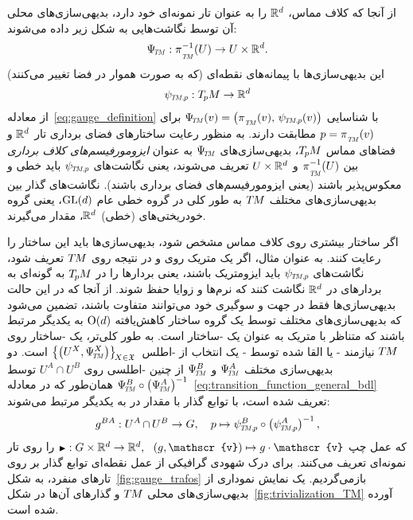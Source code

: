 از آنجا که کلاف مماس، $\mathbb{R}^d$ را به عنوان تار نمونه‌ای خود دارد، بدیهی‌سازی‌های محلی آن توسط نگاشت‌هایی به شکل زیر داده می‌شوند:
\begin{align}\label{eq:trivialization_TM}
	{\PsiTM: \piTM^{-1}\!\left(U\right) \to U\times\R^d} .
\end{align}
این بدیهی‌سازی‌ها با پیمانه‌های نقطه‌ای (که به صورت هموار در فضا تغییر می‌کنند)
\begin{align}\label{eq:def_psiTMp}
	\psiTMp: \TpM \to \R^d
\end{align}
از معادله~\eqref{eq:gauge_definition} با شناسایی $\PsiTM(v) = \left(\piTM(v),\, \psiTMp(v) \right)$ برای $p=\piTM(v)$ مطابقت دارند.
به منظور رعایت ساختارهای فضای برداری تار $\mathbb{R}^d$ و فضاهای مماس $T_{\mkern-1.5mu p}\mkern-.5muM$، بدیهی‌سازی‌های $\PsiTM$ به عنوان \emph{ایزومورفیسم‌های کلاف برداری} بین $\piTM^{-1}(U)$ و $U\times\mathbb{R}^d$ تعریف می‌شوند، یعنی نگاشت‌های $\psiTMp$ باید خطی و معکوس‌پذیر باشند (یعنی ایزومورفیسم‌های فضای برداری باشند).
نگاشت‌های گذار بین بدیهی‌سازی‌های مختلف $T\mkern-1.5muM$ به طور کلی در گروه خطی عام $\operatorname{GL}(d)$، یعنی گروه خودریختی‌های (خطی) $\mathbb{R}^d$، مقدار می‌گیرند.


اگر ساختار بیشتری روی کلاف مماس مشخص شود، بدیهی‌سازی‌ها باید این ساختار را رعایت کنند.
به عنوان مثال، اگر یک متریک روی  و در نتیجه روی $T\mkern-1.5muM$ تعریف شود، نگاشت‌های $\psiTMp$ باید ایزومتریک باشند، یعنی بردارها را در $T_{\mkern-1.5mu p}\mkern-.5muM$ به گونه‌ای به بردارهای در $\mathbb{R}^d$ نگاشت کنند که نرم‌ها و زوایا حفظ شوند.
از آنجا که در این حالت بدیهی‌سازی‌ها فقط در جهت و سوگیری خود می‌توانند متفاوت باشند، تضمین می‌شود که بدیهی‌سازی‌های مختلف توسط یک گروه ساختار کاهش‌یافته $\operatorname{O}(d)$ به یکدیگر مرتبط باشند که متناظر با متریک به عنوان یک -ساختار است.
به طور کلی‌تر، یک -ساختار روی $T\mkern-1.5muM$ نیازمند - یا القا شده توسط - یک انتخاب از -اطلس $\big\{ \big(U^X, \PsiTM^X \big) \big\}_{\!X\in\mathfrak{X}}\,$ است.
دو بدیهی‌سازی مختلف $\PsiTM^A$ و $\PsiTM^B$ از چنین -اطلسی روی $U^A\cap U^B$ توسط ${\PsiTM^B\circ\big(\PsiTM^A\big)^{-1}}$ همان‌طور که در معادله~\eqref{eq:transition_function_general_bdl} تعریف شده است، با توابع گذار با مقدار در  به یکدیگر مرتبط می‌شوند:
\begin{align}\label{eq:transition_fct_TM_gAB}
	g^{BA}: U^A\mkern-1mu \cap\mkern-1mu U^B \to G,\ \ \ p \mapsto \psiTMp^B\circ \big(\psiTMp^A\big)^{-1} \,,
\end{align}
که عمل چپ $\btr: G\times \R^d \to \R^d,\ \ (g,\mathscr{v}) \mapsto g\cdot \mathscr{v}$ را روی تار نمونه‌ای تعریف می‌کنند.
برای درک شهودی گرافیکی از عمل نقطه‌ای توابع گذار بر روی تارهای منفرد، به شکل~\ref{fig:gauge_trafos} بازمی‌گردیم.
یک نمایش نموداری از بدیهی‌سازی‌های محلی $T\mkern-1.5muM$ و گذارهای آن‌ها در شکل~\ref{fig:trivialization_TM} آورده شده است.


